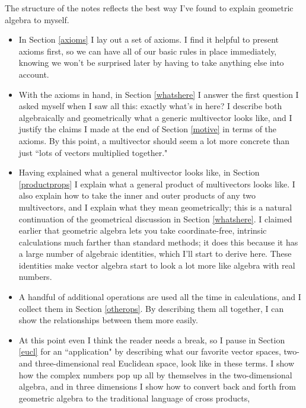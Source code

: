 \documentclass{utarticle}
\begin{document}
The structure of the notes reflects the best way I've found to explain geometric 
algebra to myself.
\begin{itemize}
\item In Section \ref{axioms} I lay out a set of axioms.  I find it helpful to present 
          axioms first, so we can have all of our basic rules in place immediately,
          knowing we won't be surprised later by having to take anything else into account.
\item With the axioms in hand, in Section \ref{whatshere} I answer the first question
          I asked myself when I saw all this: exactly what's in here?  I describe
          both algebraically and geometrically what a generic multivector looks like, 
          and I justify the claims I made at the end of Section \ref{motive} in terms of the 
          axioms.  By this point, a multivector should seem a lot more concrete than just 
          ``lots of vectors multiplied together."
\item Having explained what a general multivector looks like, in Section \ref{productprops}
          I explain what a general product of multivectors looks like.  I also explain how to
          take the inner and outer products of any two multivectors, and I explain what they 
          mean geometrically; this is a natural continuation of the geometrical discussion in 
          Section \ref{whatshere}.  I claimed earlier that geometric algebra lets you take coordinate-free, 
          intrinsic calculations much farther than standard methods; it does this because it
          has a large number of algebraic identities, which I'll start to derive here.  These identities
          make vector algebra start to look a lot more like algebra with real numbers.
\item A handful of additional operations are used all the time in calculations,
          and I collect them in Section \ref{otherops}.  By describing them all together, I
          can show the relationships between them more easily.
\item At this point even I think the reader needs a break, so I pause in Section \ref{eucl} 
          for an ``application" by describing what our favorite vector spaces, two- and three-dimensional 
          real Euclidean space, look like in these terms.  I show how the complex numbers pop up all 
          by themselves in the two-dimensional algebra, and in three dimensions I show how to
          convert back and forth from geometric algebra to the traditional language of cross products,

\end{itemize}
\end{document}
